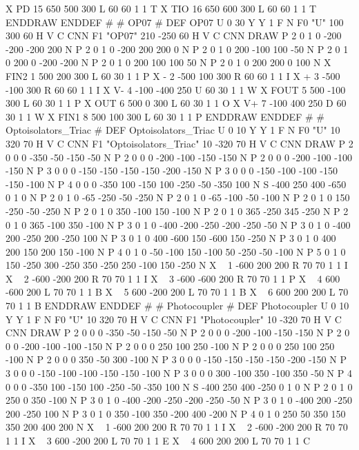 X PD 15 650 500 300 L 60 60 1 1 T
X TIO 16 650 600 300 L 60 60 1 1 T
ENDDRAW
ENDDEF
#
# OP07
#
DEF OP07 U 0 30 Y Y 1 F N
F0 "U" 100 300 60 H V C CNN
F1 "OP07" 210 -250 60 H V C CNN
DRAW
P 2 0 1 0  -200 -200  -200 200 N
P 2 0 1 0  -200 200  200 0 N
P 2 0 1 0  200 -100  100 -50 N
P 2 0 1 0  200 0  -200 -200 N
P 2 0 1 0  200 100  100 50 N
P 2 0 1 0  200 200  0 100 N
X FIN2 1 500 200 300 L 60 30 1 1 P
X - 2 -500 100 300 R 60 60 1 1 I
X + 3 -500 -100 300 R 60 60 1 1 I
X V- 4 -100 -400 250 U 60 30 1 1 W
X FOUT 5 500 -100 300 L 60 30 1 1 P
X OUT 6 500 0 300 L 60 30 1 1 O
X V+ 7 -100 400 250 D 60 30 1 1 W
X FIN1 8 500 100 300 L 60 30 1 1 P
ENDDRAW
ENDDEF
#
# Optoisolators_Triac
#
DEF Optoisolators_Triac U 0 10 Y Y 1 F N
F0 "U" 10 320 70 H V C CNN
F1 "Optoisolators_Triac" 10 -320 70 H V C CNN
DRAW
P 2 0 0 0  -350 -50  -150 -50 N
P 2 0 0 0  -200 -100  -150 -150 N
P 2 0 0 0  -200 -100  -100 -150 N
P 3 0 0 0  -150 -150  -150 -150  -200 -150 N
P 3 0 0 0  -150 -100  -100 -150  -150 -100 N
P 4 0 0 0  -350 100  -150 100  -250 -50  -350 100 N
S -400 250 400 -650 0 1 0 N
P 2 0 1 0  -65 -250  -50 -250 N
P 2 0 1 0  -65 -100  -50 -100 N
P 2 0 1 0  150 -250  -50 -250 N
P 2 0 1 0  350 -100  150 -100 N
P 2 0 1 0  365 -250  345 -250 N
P 2 0 1 0  365 -100  350 -100 N
P 3 0 1 0  -400 -200  -250 -200  -250 -50 N
P 3 0 1 0  -400 200  -250 200  -250 100 N
P 3 0 1 0  400 -600  150 -600  150 -250 N
P 3 0 1 0  400 200  150 200  150 -100 N
P 4 0 1 0  -50 -100  150 -100  50 -250  -50 -100 N
P 5 0 1 0  150 -250  300 -250  350 -250  250 -100  150 -250 N
X ~ 1 -600 200 200 R 70 70 1 1 I
X ~ 2 -600 -200 200 R 70 70 1 1 I
X ~ 3 -600 -600 200 R 70 70 1 1 P
X ~ 4 600 -600 200 L 70 70 1 1 B
X ~ 5 600 -200 200 L 70 70 1 1 B
X ~ 6 600 200 200 L 70 70 1 1 B
ENDDRAW
ENDDEF
#
# Photocoupler
#
DEF Photocoupler U 0 10 Y Y 1 F N
F0 "U" 10 320 70 H V C CNN
F1 "Photocoupler" 10 -320 70 H V C CNN
DRAW
P 2 0 0 0  -350 -50  -150 -50 N
P 2 0 0 0  -200 -100  -150 -150 N
P 2 0 0 0  -200 -100  -100 -150 N
P 2 0 0 0  250 100  250 -100 N
P 2 0 0 0  250 100  250 -100 N
P 2 0 0 0  350 -50  300 -100 N
P 3 0 0 0  -150 -150  -150 -150  -200 -150 N
P 3 0 0 0  -150 -100  -100 -150  -150 -100 N
P 3 0 0 0  300 -100  350 -100  350 -50 N
P 4 0 0 0  -350 100  -150 100  -250 -50  -350 100 N
S -400 250 400 -250 0 1 0 N
P 2 0 1 0  250 0  350 -100 N
P 3 0 1 0  -400 -200  -250 -200  -250 -50 N
P 3 0 1 0  -400 200  -250 200  -250 100 N
P 3 0 1 0  350 -100  350 -200  400 -200 N
P 4 0 1 0  250 50  350 150  350 200  400 200 N
X ~ 1 -600 200 200 R 70 70 1 1 I
X ~ 2 -600 -200 200 R 70 70 1 1 I
X ~ 3 600 -200 200 L 70 70 1 1 E
X ~ 4 600 200 200 L 70 70 1 1 C
